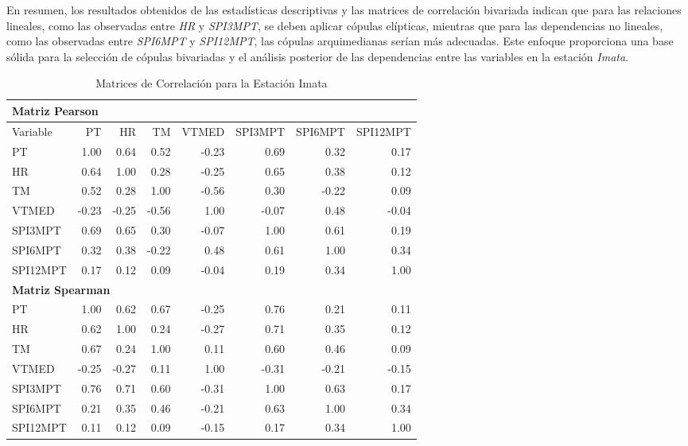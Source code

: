 En resumen, los resultados obtenidos de las estadísticas descriptivas y las matrices de correlación bivariada indican que para las relaciones lineales, como las observadas entre \textit{HR} y \textit{SPI3MPT}, se deben aplicar cópulas elípticas, mientras que para las dependencias no lineales, como las observadas entre \textit{SPI6MPT} y \textit{SPI12MPT}, las cópulas arquimedianas serían más adecuadas. Este enfoque proporciona una base sólida para la selección de cópulas bivariadas y el análisis posterior de las dependencias entre las variables en la estación \textit{Imata}.



\begin{table}[ht]
\centering
\caption{Matrices de Correlación para la Estación Imata}
\begin{tabular}{lrrrrrrr}
\toprule
\multicolumn{8}{l}{\textbf{Matriz Pearson}} \\
\midrule
Variable & PT & HR & TM & VTMED & SPI3MPT & SPI6MPT & SPI12MPT \\
\midrule
PT       & 1.00 & 0.64 & 0.52 & -0.23 & 0.69 & 0.32 & 0.17 \\
HR       & 0.64 & 1.00 & 0.28 & -0.25 & 0.65 & 0.38 & 0.12 \\
TM       & 0.52 & 0.28 & 1.00 & -0.56 & 0.30 & -0.22 & 0.09 \\
VTMED    & -0.23 & -0.25 & -0.56 & 1.00 & -0.07 & 0.48 & -0.04 \\
SPI3MPT  & 0.69 & 0.65 & 0.30 & -0.07 & 1.00 & 0.61 & 0.19 \\
SPI6MPT  & 0.32 & 0.38 & -0.22 & 0.48 & 0.61 & 1.00 & 0.34 \\
SPI12MPT & 0.17 & 0.12 & 0.09 & -0.04 & 0.19 & 0.34 & 1.00 \\
\midrule
\multicolumn{8}{l}{\textbf{Matriz Spearman}} \\
\midrule
PT       & 1.00 & 0.62 & 0.67 & -0.25 & 0.76 & 0.21 & 0.11 \\
HR       & 0.62 & 1.00 & 0.24 & -0.27 & 0.71 & 0.35 & 0.12 \\
TM       & 0.67 & 0.24 & 1.00 & 0.11 & 0.60 & 0.46 & 0.09 \\
VTMED    & -0.25 & -0.27 & 0.11 & 1.00 & -0.31 & -0.21 & -0.15 \\
SPI3MPT  & 0.76 & 0.71 & 0.60 & -0.31 & 1.00 & 0.63 & 0.17 \\
SPI6MPT  & 0.21 & 0.35 & 0.46 & -0.21 & 0.63 & 1.00 & 0.34 \\
SPI12MPT & 0.11 & 0.12 & 0.09 & -0.15 & 0.17 & 0.34 & 1.00 \\

\end{tabular}
\end{table}
